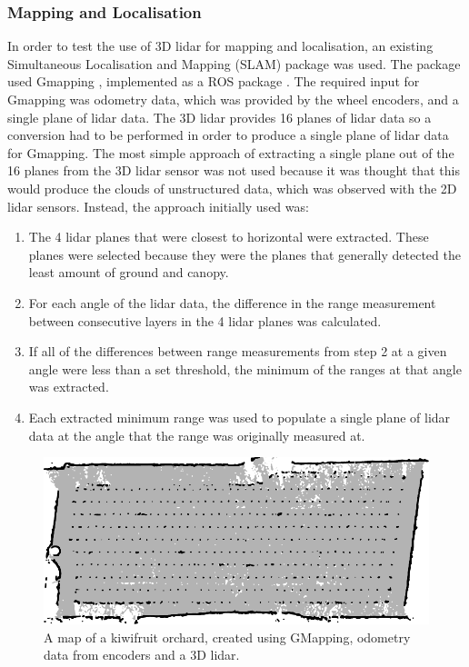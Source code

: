\documentclass[preprint,authoryear,12pt]{elsarticle}
\begin{document}
\subsubsection{Mapping and Localisation}
    In order to test the use of 3D lidar for mapping and localisation, an existing Simultaneous Localisation and Mapping (SLAM) package was used.
	The package used Gmapping \citep{Grisetti2007}, implemented as a ROS package \citep{Gerkey}.
	The required input for Gmapping was odometry data, which was provided by the wheel encoders, and a single plane of lidar data.
	The 3D lidar provides 16 planes of lidar data so a conversion had to be performed in order to produce a single plane of lidar data for Gmapping.
	The most simple approach of extracting a single plane out of the 16 planes from the 3D lidar sensor was not used because it was thought that this would produce the clouds of unstructured data, which was observed with the 2D lidar sensors.
	Instead, the approach initially used was:
    \begin{enumerate}
    \item The 4 lidar planes that were closest to horizontal were extracted.
	These planes were selected because they were the planes that generally detected the least amount of ground and canopy.
    \item For each angle of the lidar data, the difference in the range measurement between consecutive layers in the 4 lidar planes was calculated.
	
    \item If all of the differences between range measurements from step 2 at a given angle were less than a set threshold, the minimum of the ranges at that angle was extracted.
    \item Each extracted minimum range was used to populate a single plane of lidar data at the angle that the range was originally measured at.
    \end{enumerate}

    \begin{figure}[htb]
        \centering
        \includegraphics{imgs/gmapmap/gmapmap.pdf}
        \caption{
            A map of a kiwifruit orchard, created using GMapping, odometry data from encoders and a 3D lidar.
        }
        \label{fig:gmapmap}
    \end{figure}
\end{document}
